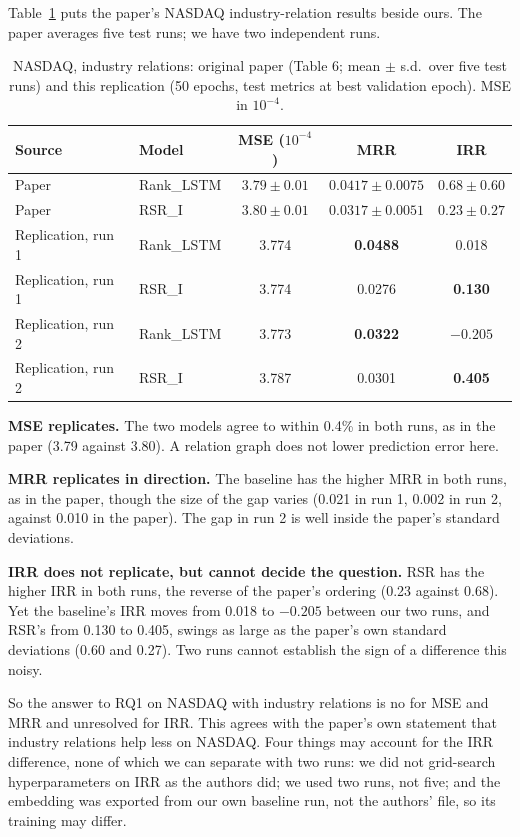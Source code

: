 \documentclass[12pt]{article}
\begin{document}
Table~\ref{tab:main} puts the paper's NASDAQ industry-relation results beside ours. The paper
averages five test runs; we have two independent runs.

\begin{table}[h]
\centering
\caption{NASDAQ, industry relations: original paper (Table 6; mean $\pm$ s.d.\ over five test
runs) and this replication (50 epochs, test metrics at best validation epoch). MSE in
$10^{-4}$.}
\label{tab:main}
\begin{tabular}{llccc}
\toprule
Source & Model & MSE ($10^{-4}$) & MRR & IRR \\
\midrule
Paper & Rank\_LSTM & $3.79\pm0.01$ & $0.0417\pm0.0075$ & $0.68\pm0.60$ \\
Paper & RSR\_I & $3.80\pm0.01$ & $0.0317\pm0.0051$ & $0.23\pm0.27$ \\
\midrule
Replication, run 1 & Rank\_LSTM & 3.774 & \textbf{0.0488} & 0.018 \\
Replication, run 1 & RSR\_I & 3.774 & 0.0276 & \textbf{0.130} \\
\midrule
Replication, run 2 & Rank\_LSTM & 3.773 & \textbf{0.0322} & $-0.205$ \\
Replication, run 2 & RSR\_I & 3.787 & 0.0301 & \textbf{0.405} \\
\bottomrule
\end{tabular}
\end{table}

\textbf{MSE replicates.} The two models agree to within 0.4\% in both runs, as in the paper
(3.79 against 3.80). A relation graph does not lower prediction error here.

\textbf{MRR replicates in direction.} The baseline has the higher MRR in both runs, as in the
paper, though the size of the gap varies (0.021 in run 1, 0.002 in run 2, against 0.010 in the
paper). The gap in run 2 is well inside the paper's standard deviations.

\textbf{IRR does not replicate, but cannot decide the question.} RSR has the higher IRR in both
runs, the reverse of the paper's ordering (0.23 against 0.68). Yet the baseline's IRR moves from
0.018 to $-0.205$ between our two runs, and RSR's from 0.130 to 0.405, swings as large as the
paper's own standard deviations (0.60 and 0.27). Two runs cannot establish the sign of a
difference this noisy.

So the answer to RQ1 on NASDAQ with industry relations is no for MSE and MRR and unresolved for
IRR. This agrees with the paper's own statement that industry relations help less on NASDAQ.
Four things may account for the IRR difference, none of which we can separate with two runs:
we did not grid-search hyperparameters on IRR as the authors did; we used two runs, not five;
and the embedding was exported from our own baseline run, not the authors' file, so its
training may differ.
\end{document}
